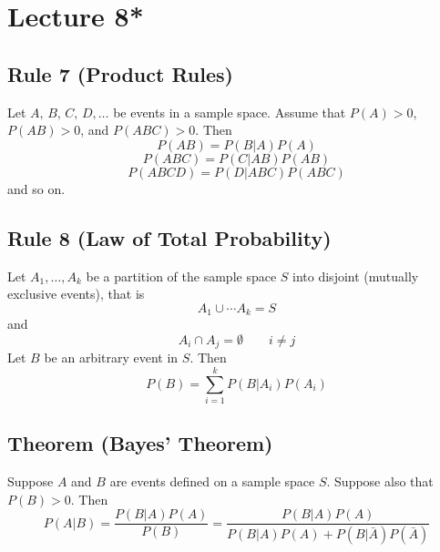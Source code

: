 \section{Lecture 8*}

\begin{thmbox}
    \subsection{Rule 7 (Product Rules)}
    Let $ A,\,B,\,C,\,D,\ldots  $ be events in a sample space. Assume
    that $ P(A)>0 $, $ P(AB)>0 $, and $ P(ABC)>0 $. Then
    \[ P(AB)=P(B|A)P(A) \]
    \[ P(ABC)=P(C|AB)P(AB) \]
    \[ P(ABCD)=P(D|ABC)P(ABC) \]
    and so on.
\end{thmbox}

\begin{thmbox}
    \subsection{Rule 8 (Law of Total Probability)}
    Let $ A_1,\ldots ,A_k $ be a partition of the sample space $ S $
    into disjoint (mutually exclusive events), that is
    \[ A_1\cup\cdots A_k=S \]
    and
    \[ A_i\cap A_j=\emptyset\qquad i\neq j \]
    Let $ B $ be an arbitrary event in $ S $. Then
    \[ P(B)=\sum\limits_{i=1}^{k} P(B|A_i)P(A_i) \]
\end{thmbox}

\begin{thmbox}
    \subsection{Theorem (Bayes' Theorem)}
    Suppose $ A $ and $ B $ are events defined on a sample space $ S $. Suppose
    also that $ P(B)>0 $. Then
    \[ P(A|B)=\frac{P(B|A)P(A)}{P(B)}=\frac{P(B|A)P(A)}{P(B|A)P(A)+
    P(B|\bar{A})P(\bar{A})}  \]
    
\end{thmbox}